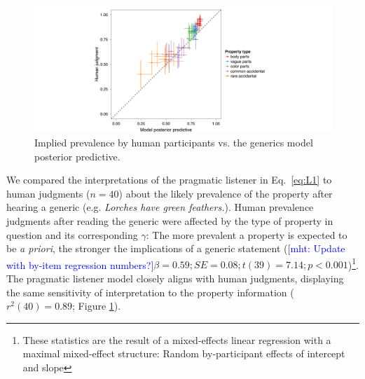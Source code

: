 \documentclass[10pt,letterpaper]{article}
\newcommand{\ndg}[1]{\textcolor{Green}{[ndg: #1]}}
\newcommand{\mht}[1]{\textcolor{Blue}{[mht: #1]}}
\begin{document}


\begin{figure}
\centering
    \includegraphics[width=0.6\columnwidth]{implied-byItem-mh100kX2.pdf}
    \caption{Implied prevalence by human participants vs. the generics model posterior predictive.}
  \label{fig:impliedByItem}
\end{figure}


We compared the interpretations of the pragmatic listener in Eq.~\ref{eq:L1} to human judgments ($n=40$) about the likely prevalence of the property after hearing a generic (e.g. \emph{Lorches have green feathers.}). %
Human prevalence judgments after reading the generic were affected by the type of property in question and its corresponding $\gamma$: The more prevalent a property is expected to be \emph{a priori}, the stronger the implications of a generic statement (\mht{Update with by-item regression numbers?}$\beta = 0.59; SE = 0.08; t(39) = 7.14; p < 0.001$)\footnote{These statistics are the result of a mixed-effects linear regression with a maximal mixed-effect structure: Random by-participant effects of intercept and slope}. 
The pragmatic listener model closely aligns with human judgments, displaying the same sensitivity of interpretation to the property information ($r^2(40)=0.89$; Figure \ref{fig:impliedByItem}). 







\end{document}
